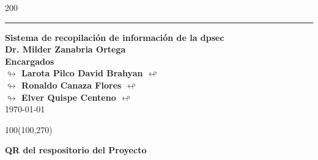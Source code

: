 \begin{titlepage}
\begin{textblock}{200}
\begin{center}
            \textcolor{azul}{\rule{0.5\linewidth}{0.80mm}} \par
            \vspace{8mm}
            {\large{\textbf{ Sistema de recopilación de información de la \gls{dpsec}}}} \\[10pt]
            {\large{\textbf{\textcolor{azul}{Dr. Milder Zanabria Ortega }}}} \\[20pt]
            {\large{\textbf{Encargados}}}\\[10pt]
            {\large{\textbf{$\looparrowright$   Larota Pilco David Brahyan  $\looparrowleft$ }}}\\[5pt]
            {\large{\textbf{$\looparrowright$    Ronaldo Canaza Flores $\looparrowleft$ }}}\\[5pt]
            {\large{\textbf{$\looparrowright$    Elver Quispe Centeno $\looparrowleft$ }}}\\[5pt]
            \today

        \end{center}
    \end{textblock}

    \begin{textblock}{100}(100,270)
        \begin{flushright}

        {\normalsize{\textbf{QR del respositorio del Proyecto}}}
        \end{flushright}
        
    \end{textblock}
\end{titlepage}


